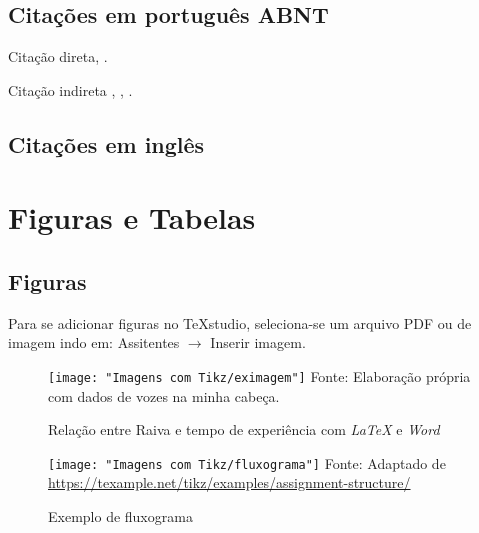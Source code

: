 \documentclass[a4paper]{article} %
\begin{document}
{\subsection{Citações em português ABNT} \label{SS21}
Citação direta, \cite{tirole_theory_1988, belleflamme_industrial_2015, anton_acquisitions_2018}. \par 
Citação indireta , , .
\subsection{Citações em inglês} \label{SS22} 
\section{Figuras e Tabelas} \label{S3}
\subsection{Figuras} \label{S31}
Para se adicionar figuras no TeXstudio, seleciona-se um arquivo PDF ou de imagem indo em: Assitentes $\rightarrow$ Inserir imagem.
\begin{figure} [H]
	\centering
	\caption{Relação entre Raiva e tempo de experiência com \textit{LaTeX} e \textit{Word}}
	\texttt{[image: "Imagens com Tikz/eximagem"]} \hspace{80mm}
	Fonte: Elaboração própria com dados de vozes na minha cabeça.
	\label{fig1}
\end{figure}
\begin{figure} [H]
	\caption{Exemplo de fluxograma}
	\centering
	\texttt{[image: "Imagens com Tikz/fluxograma"]} \hspace{80mm}
	Fonte: Adaptado de \url{https://texample.net/tikz/examples/assignment-structure/}
	\label{fig2}
\end{figure}
}
\end{document}
